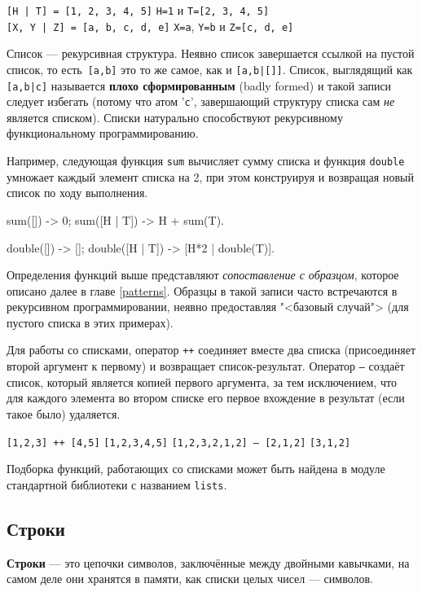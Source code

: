 \texttt{[H | T]  = [1, 2, 3, 4, 5]} \resultingin \texttt{H=1} и 
	\texttt{T=[2, 3, 4, 5]} \\
\texttt{[X, Y | Z] = [a, b, c, d, e]} \resultingin \texttt{X=a},
	\texttt{Y=b} и \texttt{Z=[c, d, e]}

Список --- рекурсивная структура. Неявно список завершается ссылкой на пустой 
список, то есть~\texttt{[a,b]} это то же самое, как и \texttt{[a,b|[]]}. 
Список, выглядящий как \texttt{[a,b|c]} называется \textbf{плохо 
сформированным} (badly formed) и такой записи следует избегать (потому что
атом '\texttt{c}', завершающий структуру списка сам \emph{не} является списком).
Списки натурально способствуют рекурсивному функциональному программированию.

Например, следующая функция \texttt{sum} вычисляет сумму списка и функция 
\texttt{double} умножает каждый элемент списка на 2, при этом конструируя и 
возвращая новый список по ходу выполнения.

\begin{erlang}
sum([]) -> 0;
sum([H | T]) -> H + sum(T).

double([]) -> [];
double([H | T]) -> [H*2 | double(T)].
\end{erlang}

Определения функций выше представляют \emph{сопоставление с образцом}, которое
описано далее в главе \ref{patterns}. Образцы в такой записи часто встречаются 
в рекурсивном программировании, неявно предоставляя "<базовый случай"> (для
пустого списка в этих примерах).

Для работы со списками, оператор \texttt{++} соединяет вместе два списка 
(присоединяет второй аргумент к первому) и возвращает список-результат.  
Оператор  \texttt{--} создаёт список, который является копией первого
аргумента, за тем исключением, что для каждого элемента во втором списке его
первое вхождение в результат (если такое было) удаляется.

\texttt{[1,2,3] ++ [4,5]} \resultingin \texttt{[1,2,3,4,5]}
\texttt{[1,2,3,2,1,2] -- [2,1,2]} \resultingin \texttt{[3,1,2]}

Подборка функций, работающих со списками может быть найдена в модуле стандартной
библиотеки с названием \texttt{lists}.


\subsection{Строки}
\label{datatypes:string}

\textbf{Строки} --- это цепочки символов, заключённые между двойными кавычками,
на самом деле они хранятся в памяти, как списки целых чисел --- символов.

